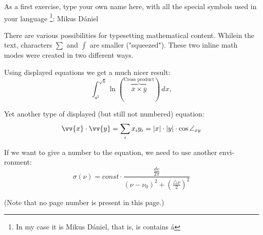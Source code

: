 \documentclass[12pt]{article}
\begin{document}
\pagestyle{empty} %
\par As a first exercise, type your own name here, with all the special symbols used in your language \footnote{In my case it is Mikus Dániel, that is, is contains á}: Mikus Dániel\par
There are various possibilities for typesetting mathematical content. Whilein the text, characters $ \sum $ and $\int$ are smaller ("squeezed"). These two inline math modes were created in two different ways. \par
Using displayed equations we get a much nicer result: 
$$\int_{a^2}^{\sqrt{b}} \ln \left( \overbrace{\overline{x} \times \overline{y}}^{\text{Cross product}}   \right)  \,dx ,$$ \par
Yet another type of displayed (but still not numbered) equation:
\[
\vv{x} \cdot \vv{y} = \sum_{i} x_i y_i = |x| \cdot |y| \cdot \cos \angle _{xy}
\] \par
If we want to give a number to the equation, we need to use another envi-ronment:
\begin{equation}
\sigma (\nu) = const \cdot \frac{\frac{dv}{2 \pi}}{(\nu - \nu _0)^2 + \left( \frac{\triangle \nu}{2} \right)^2}
\end{equation} \par
(Note that no page number is present in this page.)
\end{document}
